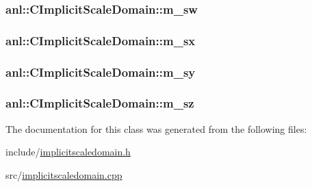 \label{classanl_1_1CImplicitScaleDomain_a44a1d1bc9344359f028286cd602c4b02}
\hypertarget{classanl_1_1CImplicitScaleDomain_a1ec149de2174686125381fe769d241b7}{
\subsubsection[{m\_\-sw}]{ {\bf anl::CImplicitScaleDomain::m\_\-sw}}}
\label{classanl_1_1CImplicitScaleDomain_a1ec149de2174686125381fe769d241b7}
\hypertarget{classanl_1_1CImplicitScaleDomain_afbde60647f06a8dfccf53868520b3421}{
\subsubsection[{m\_\-sx}]{ {\bf anl::CImplicitScaleDomain::m\_\-sx}}}
\label{classanl_1_1CImplicitScaleDomain_afbde60647f06a8dfccf53868520b3421}
\hypertarget{classanl_1_1CImplicitScaleDomain_a472d34499a26f3ee1860b6fbb9fbcf34}{
\subsubsection[{m\_\-sy}]{ {\bf anl::CImplicitScaleDomain::m\_\-sy}}}
\label{classanl_1_1CImplicitScaleDomain_a472d34499a26f3ee1860b6fbb9fbcf34}
\hypertarget{classanl_1_1CImplicitScaleDomain_a2962bc56a536e3641b9a55bfa83c20ec}{
\subsubsection[{m\_\-sz}]{ {\bf anl::CImplicitScaleDomain::m\_\-sz}}}
\label{classanl_1_1CImplicitScaleDomain_a2962bc56a536e3641b9a55bfa83c20ec}


The documentation for this class was generated from the following files:\begin{DoxyCompactItemize}
\item 
include/\hyperlink{implicitscaledomain_8h}{implicitscaledomain.h}\item 
src/\hyperlink{implicitscaledomain_8cpp}{implicitscaledomain.cpp}\end{DoxyCompactItemize}
